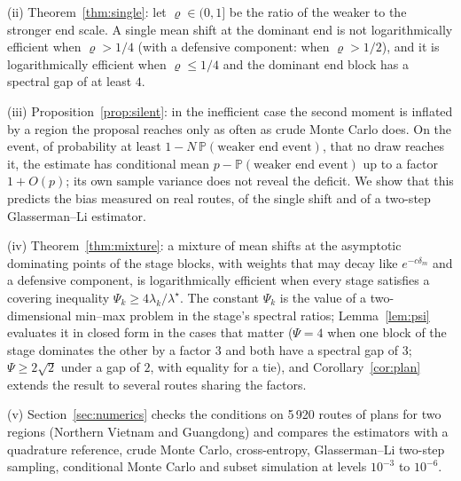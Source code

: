 \documentclass[11pt]{article}
\theoremstyle{definition}
\theoremstyle{remark}
\renewcommand{\P}{\mathbb{P}}
\begin{document}
(ii) Theorem~\ref{thm:single}: let $\varrho\in(0,1]$ be the ratio of the weaker to the
stronger end scale. A single mean shift at the dominant end is not logarithmically
efficient when $\varrho>1/4$ (with a defensive component: when $\varrho>1/2$), and it
is logarithmically efficient when $\varrho\le1/4$ and the dominant end block has a
spectral gap of at least $4$.

(iii) Proposition~\ref{prop:silent}: in the inefficient case the second moment is
inflated by a region the proposal reaches only as often as crude Monte Carlo does. On the
event, of probability at least $1-N\,\P(\text{weaker end event})$, that no draw reaches
it, the estimate has conditional mean $p-\P(\text{weaker end event})$ up to a factor
$1+O(p)$; its own sample variance does not reveal the deficit. We show that this
predicts the bias measured on real routes, of the single shift and of a two-step
Glasserman--Li estimator.

(iv) Theorem~\ref{thm:mixture}: a mixture of mean shifts at the asymptotic dominating
points of the stage blocks, with weights that may decay like $e^{-c\delta_m}$ and a
defensive component, is logarithmically efficient when every stage satisfies a covering
inequality $\Psi_k\ge4\lambda_k/\lambda^\star$. The constant $\Psi_k$ is the value of a
two-dimensional min--max problem in the stage's spectral ratios; Lemma~\ref{lem:psi}
evaluates it in closed form in the cases that matter ($\Psi=4$ when one block of the stage
dominates the other by a factor $3$ and both have a spectral gap of $3$; $\Psi\ge2\sqrt2$
under a gap of $2$, with equality for a tie), and
Corollary~\ref{cor:plan} extends the result to several routes sharing the factors.

(v) Section~\ref{sec:numerics} checks the conditions on 5\,920 routes of plans for two
regions (Northern Vietnam and Guangdong) and compares the estimators with a
quadrature reference, crude Monte Carlo, cross-entropy, Glasserman--Li two-step
sampling, conditional Monte Carlo and subset simulation at levels $10^{-3}$ to
$10^{-6}$.
\end{document}

